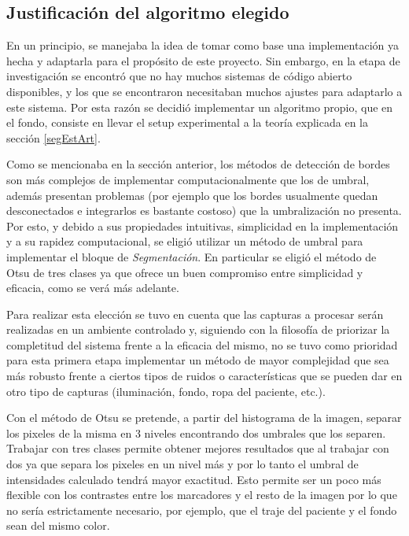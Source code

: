 


\subsection{Justificación del algoritmo elegido}

En un principio, se manejaba la idea de tomar como base una implementación ya hecha y adaptarla para el propósito de este proyecto. Sin embargo, en la etapa de investigación se encontró que no hay muchos sistemas de código abierto disponibles, y los que se encontraron necesitaban muchos ajustes para adaptarlo a este sistema. Por esta razón se decidió implementar un algoritmo propio, que en el fondo, consiste en llevar el setup experimental a la teoría explicada en la sección \ref{segEstArt}.

Como se mencionaba en la sección anterior, los métodos de detección de bordes son más complejos de implementar computacionalmente que los de umbral, además presentan problemas (por ejemplo que los bordes usualmente quedan desconectados e integrarlos es bastante costoso) que la umbralización no presenta. Por esto, y debido a sus propiedades intuitivas, simplicidad en la implementación y a su rapidez computacional, se eligió utilizar un método de umbral para implementar el bloque de \emph{Segmentación}. En particular se eligió el método de Otsu\cite{otsu} de tres clases ya que ofrece un buen compromiso entre simplicidad y eficacia, como se verá más adelante. 

Para realizar esta elección se tuvo en cuenta que las capturas a procesar serán realizadas en un ambiente controlado y, siguiendo con la filosofía de priorizar la completitud del sistema frente a la eficacia del mismo, no se tuvo como prioridad para esta primera etapa implementar un método de mayor complejidad que sea más robusto frente a ciertos tipos de ruidos o características que se pueden dar en otro tipo de capturas (iluminación, fondo, ropa del paciente, etc.). 

Con el método de Otsu\cite{otsu} se pretende, a partir del histograma de la imagen, separar los pixeles de la misma en 3 niveles encontrando dos umbrales que los separen. Trabajar con tres clases permite obtener mejores resultados que al trabajar con dos ya que separa los pixeles en un nivel más y por lo tanto el umbral de intensidades calculado tendrá mayor exactitud. Esto permite ser un poco más flexible con los contrastes entre los marcadores y el resto de la imagen por lo que no sería estrictamente necesario, por ejemplo, que el traje del paciente y el fondo sean del mismo color.

